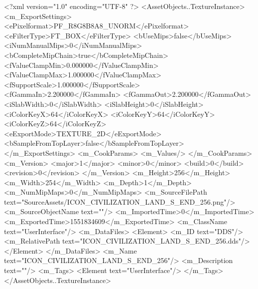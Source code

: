 <?xml version="1.0" encoding="UTF-8" ?>
<AssetObjects..TextureInstance>
	<m_ExportSettings>
		<ePixelformat>PF_R8G8B8A8_UNORM</ePixelformat>
		<eFilterType>FT_BOX</eFilterType>
		<bUseMips>false</bUseMips>
		<iNumManualMips>0</iNumManualMips>
		<bCompleteMipChain>true</bCompleteMipChain>
		<fValueClampMin>0.000000</fValueClampMin>
		<fValueClampMax>1.000000</fValueClampMax>
		<fSupportScale>1.000000</fSupportScale>
		<fGammaIn>2.200000</fGammaIn>
		<fGammaOut>2.200000</fGammaOut>
		<iSlabWidth>0</iSlabWidth>
		<iSlabHeight>0</iSlabHeight>
		<iColorKeyX>64</iColorKeyX>
		<iColorKeyY>64</iColorKeyY>
		<iColorKeyZ>64</iColorKeyZ>
		<eExportMode>TEXTURE_2D</eExportMode>
		<bSampleFromTopLayer>false</bSampleFromTopLayer>
	</m_ExportSettings>
	<m_CookParams>
		<m_Values/>
	</m_CookParams>
	<m_Version>
		<major>1</major>
		<minor>0</minor>
		<build>0</build>
		<revision>0</revision>
	</m_Version>
	<m_Height>256</m_Height>
	<m_Width>254</m_Width>
	<m_Depth>1</m_Depth>
	<m_NumMipMaps>0</m_NumMipMaps>
	<m_SourceFilePath text="SourceAssets/ICON_CIVILIZATION_LAND_S_END_256.png"/>
	<m_SourceObjectName text=""/>
	<m_ImportedTime>0</m_ImportedTime>
	<m_ExportedTime>1551834609</m_ExportedTime>
	<m_ClassName text="UserInterface"/>
	<m_DataFiles>
		<Element>
			<m_ID text="DDS"/>
			<m_RelativePath text="ICON_CIVILIZATION_LAND_S_END_256.dds"/>
		</Element>
	</m_DataFiles>
	<m_Name text="ICON_CIVILIZATION_LAND_S_END_256"/>
	<m_Description text=""/>
	<m_Tags>
		<Element text="UserInterface"/>
	</m_Tags>
</AssetObjects..TextureInstance>

